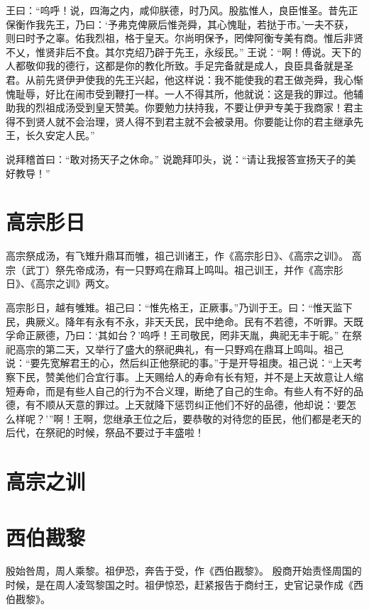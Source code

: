 \documentclass[12pt,UTF8]{ctexbook}
\begin{document}
王曰：“呜呼！说，四海之内，咸仰朕德，时乃风。股肱惟人，良臣惟圣。昔先正保衡作我先王，乃曰：‘予弗克俾厥后惟尧舜，其心愧耻，若挞于市。’一夫不获，则曰时予之辜。佑我烈祖，格于皇天。尔尚明保予，罔俾阿衡专美有商。惟后非贤不乂，惟贤非后不食。其尔克绍乃辟于先王，永绥民。”
王说：“啊！傅说。天下的人都敬仰我的德行，这都是你的教化所致。手足完备就是成人，良臣具备就是圣君。从前先贤伊尹使我的先王兴起，他这样说：我不能使我的君王做尧舜，我心惭愧耻辱，好比在闹市受到鞭打一样。一人不得其所，他就说：这是我的罪过。他辅助我的烈祖成汤受到皇天赞美。你要勉力扶持我，不要让伊尹专美于我商家！君主得不到贤人就不会治理，贤人得不到君主就不会被录用。你要能让你的君主继承先王，长久安定人民。”

说拜稽首曰：“敢对扬天子之休命。”
说跪拜叩头，说：“请让我报答宣扬天子的美好教导！”\\

\chapter{高宗肜日}

高宗祭成汤，有飞雉升鼎耳而雊，祖己训诸王，作《高宗肜日》、《高宗之训》。
高宗（武丁）祭先帝成汤，有一只野鸡在鼎耳上鸣叫。祖己训王，并作《高宗肜日》、《高宗之训》两文。

高宗肜日，越有雊雉。祖己曰：“惟先格王，正厥事。”乃训于王。曰：“惟天监下民，典厥义。降年有永有不永，非天夭民，民中绝命。民有不若德，不听罪。天既孚命正厥德，乃曰：‘其如台？’呜呼！王司敬民，罔非天胤，典祀无丰于昵。”
在祭祀高宗的第二天，又举行了盛大的祭祀典礼，有一只野鸡在鼎耳上鸣叫。祖己说：“要先宽解君王的心，然后纠正他祭祀的事。”于是开导祖庚。祖己说：“上天考察下民，赞美他们合宜行事。上天赐给人的寿命有长有短，并不是上天故意让人缩短寿命，而是有些人自己的行为不合义理，断绝了自己的生命。有些人有不好的品德，有不顺从天意的罪过。上天就降下惩罚纠正他们不好的品德，他却说：‘要怎么样呢？’”啊！王啊，您继承王位之后，要恭敬的对待您的臣民，他们都是老天的后代，在祭祀的时候，祭品不要过于丰盛啦！

\chapter{高宗之训}
\chapter{西伯戡黎}

殷始咎周，周人乘黎。祖伊恐，奔告于受，作《西伯戡黎》。
殷商开始责怪周国的时候，是在周人凌驾黎国之时。祖伊惊恐，赶紧报告于商纣王，史官记录作成《西伯戡黎》。
\end{document}
